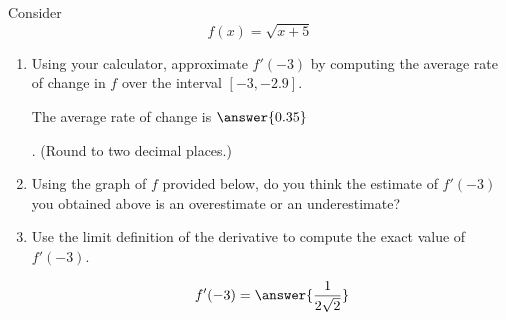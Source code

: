 \documentclass{ximera}
\author{Steven Gubkin \and Bobby Ramsey}
\begin{document}
\begin{exercise}

Consider 
\[
f(x) = \sqrt{x+5}
\]

\begin{enumerate}
\item Using your calculator, approximate $f'(-3)$ by computing the average rate of change in $f$ over the interval $[-3,-2.9]$. \begin{prompt}   The average rate of change is  $\answer{0.35}$\end{prompt}. (Round to two decimal places.)  %
\item Using the graph of $f$ provided below, do you think the estimate of $f'(-3)$ you obtained above is an overestimate or an underestimate?

\begin{prompt}
\begin{multipleChoice}
\end{multipleChoice}
\end{prompt}

\begin{image}
\end{image}

\item Use the limit definition of the derivative to compute the exact value of $f'(-3)$.  \begin{prompt}$$f'(-3) = \answer{\frac{1}{2\sqrt{2}}}$$\end{prompt}
\end{enumerate}
\end{exercise}
\end{document}
